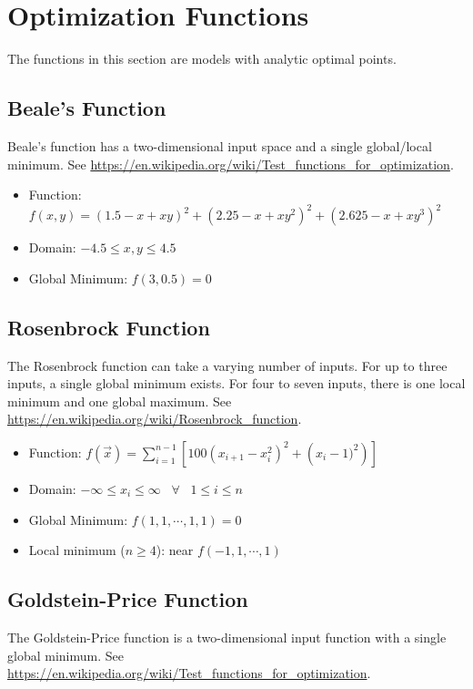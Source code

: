 \section{Optimization Functions}

The functions in this section are models with analytic optimal points.

\subsection{Beale's Function}
Beale's function has a two-dimensional input space and a single global/local minimum.
See \url{https://en.wikipedia.org/wiki/Test_functions_for_optimization}.

\begin{itemize}
  \item Function: $f(x,y) = (1.5-x+xy)^2+(2.25-x+xy^2)^2+(2.625-x+xy^3)^2$
  \item Domain: $-4.5 \leq x,y \leq 4.5$
  \item Global Minimum: $f(3,0.5)=0$
\end{itemize}


\subsection{Rosenbrock Function}
The Rosenbrock function can take a varying number of inputs.  For up to three inputs, a single global minimum
exists.  For four to seven inputs, there is one local minimum and one global maximum.
See \url{https://en.wikipedia.org/wiki/Rosenbrock_function}.

\begin{itemize}
  \item Function: $f(\vec x) = \sum_{i=1}^{n-1}\left[100\left(x_{i+1}-x_i^2\right)^2+\left(x_i-1)^2\right) \right]$
  \item Domain: $ -\infty \leq x_i \leq \infty \hspace{10pt} \forall \hspace{10pt} 1\leq i \leq n$
  \item Global Minimum: $f(1,1,\cdots,1,1)=0$
  \item Local minimum ($n\geq4$): near $f(-1,1,\cdots,1)$
\end{itemize}


\subsection{Goldstein-Price Function}
The Goldstein-Price function is a two-dimensional input function with a single global minimum.
See \url{https://en.wikipedia.org/wiki/Test_functions_for_optimization}.

